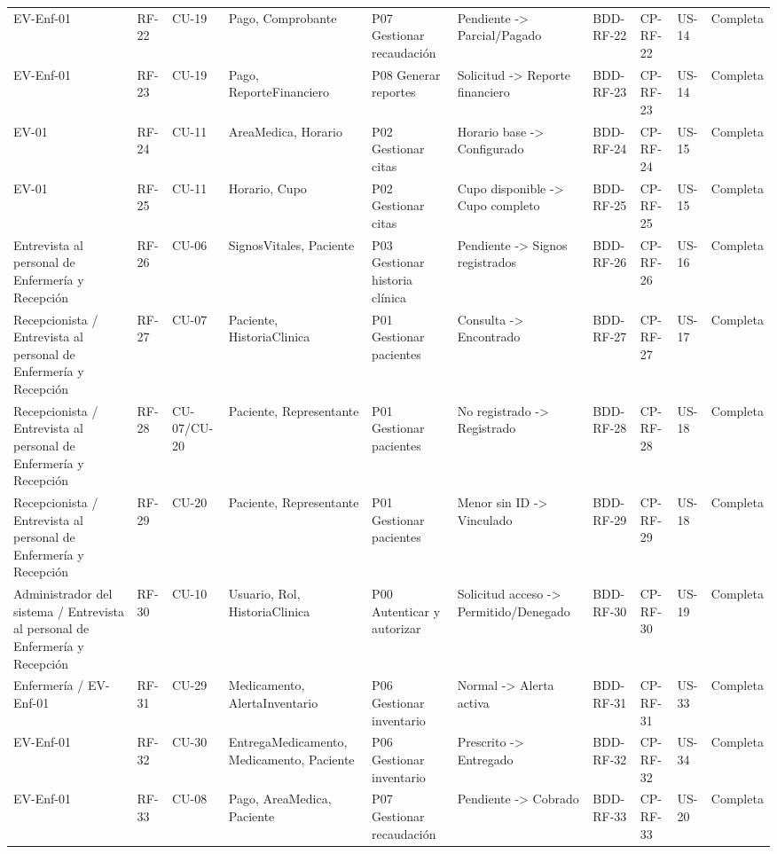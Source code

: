 \documentclass[11pt,a4paper]{article}
\begin{document}
\begin{appendices}
\begin{landscape}
\begin{longtable}{p{2.2cm}p{1.8cm}p{2cm}p{3cm}p{3cm}p{3cm}p{2cm}p{2cm}p{2cm}p{1.6cm}}
			EV-Enf-01 & RF-22 & CU-19 & Pago, Comprobante & P07 Gestionar recaudación & Pendiente -> Parcial/Pagado & BDD-RF-22 & CP-RF-22 & US-14 & Completa\\
			EV-Enf-01 & RF-23 & CU-19 & Pago, ReporteFinanciero & P08 Generar reportes & Solicitud -> Reporte financiero & BDD-RF-23 & CP-RF-23 & US-14 & Completa\\
			EV-01 & RF-24 & CU-11 & AreaMedica, Horario & P02 Gestionar citas & Horario base -> Configurado & BDD-RF-24 & CP-RF-24 & US-15 & Completa\\
			EV-01 & RF-25 & CU-11 & Horario, Cupo & P02 Gestionar citas & Cupo disponible -> Cupo completo & BDD-RF-25 & CP-RF-25 & US-15 & Completa\\
			Entrevista al personal de Enfermería y Recepción & RF-26 & CU-06 & SignosVitales, Paciente & P03 Gestionar historia clínica & Pendiente -> Signos registrados & BDD-RF-26 & CP-RF-26 & US-16 & Completa\\
			Recepcionista / Entrevista al personal de Enfermería y Recepción & RF-27 & CU-07 & Paciente, HistoriaClinica & P01 Gestionar pacientes & Consulta -> Encontrado & BDD-RF-27 & CP-RF-27 & US-17 & Completa\\
			Recepcionista / Entrevista al personal de Enfermería y Recepción & RF-28 & CU-07/CU-20 & Paciente, Representante & P01 Gestionar pacientes & No registrado -> Registrado & BDD-RF-28 & CP-RF-28 & US-18 & Completa\\
			Recepcionista / Entrevista al personal de Enfermería y Recepción & RF-29 & CU-20 & Paciente, Representante & P01 Gestionar pacientes & Menor sin ID -> Vinculado & BDD-RF-29 & CP-RF-29 & US-18 & Completa\\
			Administrador del sistema / Entrevista al personal de Enfermería y Recepción & RF-30 & CU-10 & Usuario, Rol, HistoriaClinica & P00 Autenticar y autorizar & Solicitud acceso -> Permitido/Denegado & BDD-RF-30 & CP-RF-30 & US-19 & Completa\\
			Enfermería / EV-Enf-01 & RF-31 & CU-29 & Medicamento, AlertaInventario & P06 Gestionar inventario & Normal -> Alerta activa & BDD-RF-31 & CP-RF-31 & US-33 & Completa\\
			EV-Enf-01 & RF-32 & CU-30 & EntregaMedicamento, Medicamento, Paciente & P06 Gestionar inventario & Prescrito -> Entregado & BDD-RF-32 & CP-RF-32 & US-34 & Completa\\
			EV-Enf-01 & RF-33 & CU-08 & Pago, AreaMedica, Paciente & P07 Gestionar recaudación & Pendiente -> Cobrado & BDD-RF-33 & CP-RF-33 & US-20 & Completa\\

\end{longtable}
\end{landscape}
\end{appendices}
\end{document}
